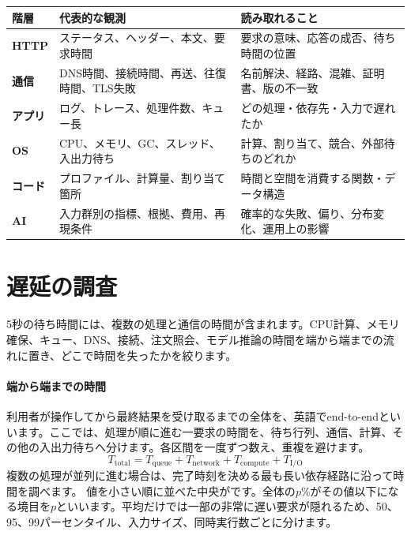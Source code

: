 \begingroup
  \noindent
  \begin{tabularx}{\textwidth}{@{}>{\bfseries}p{19mm}YY@{}}
    \toprule
    階層 & 代表的な観測 & 読み取れること \\
    \midrule
    HTTP & ステータス、ヘッダー、本文、要求時間 & 要求の意味、応答の成否、待ち時間の位置 \\
    通信 & DNS時間、接続時間、再送、往復時間、TLS失敗 & 名前解決、経路、混雑、証明書、版の不一致 \\
    アプリ & ログ、トレース、処理件数、キュー長 & どの処理・依存先・入力で遅れたか \\
    OS & CPU、メモリ、GC、スレッド、入出力待ち & 計算、割り当て、競合、外部待ちのどれか \\
    コード & プロファイル、計算量、割り当て箇所 & 時間と空間を消費する関数・データ構造 \\
    AI & 入力群別の指標、根拠、費用、再現条件 & 確率的な失敗、偏り、分布変化、運用上の影響 \\
    \bottomrule
  \end{tabularx}
  \vspace{1mm}
\par
\endgroup


\section{遅延の調査}
\label{sec:07-practice-08}

5秒の待ち時間には、複数の処理と通信の時間が含まれます。CPU計算、メモリ確保、キュー、DNS、接続、注文照会、モデル推論の時間を端から端までの流れに置き、どこで時間を失ったかを絞ります。

\begingroup
\begingroup
\paragraph{端から端までの時間}
        利用者が操作してから最終結果を受け取るまでの全体を、英語でend-to-endといいます。ここでは、処理が順に進む一要求の時間を、待ち行列、通信、計算、その他の入出力待ちへ分けます。各区間を一度ずつ数え、重複を避けます。
        \[
          T_{\mathrm{total}}=
          T_{\mathrm{queue}}+T_{\mathrm{network}}+
          T_{\mathrm{compute}}+T_{\mathrm{I/O}}
        \]
        複数の処理が並列に進む場合は、完了時刻を決める最も長い依存経路に沿って時間を調べます。
        値を小さい順に並べた中央がです。全体の$p$\%がその値以下になる境目を$p$といいます。平均だけでは一部の非常に遅い要求が隠れるため、50、95、99パーセンタイル、入力サイズ、同時実行数ごとに分けます。

